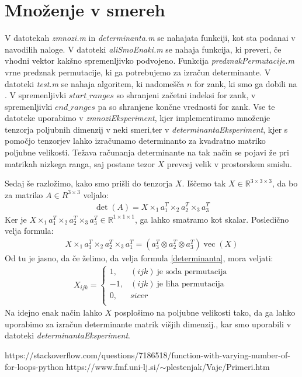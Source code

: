 \documentclass[a4paper,12pt]{article}
\def\R{\mathbb{R}} %
\DeclareMathOperator{\ve}{vec}
\begin{document}
\section{Množenje v smereh}
V datotekah \emph{zmnozi.m} in \emph{determinanta.m} se nahajata funkciji, kot sta podanai v navodilih naloge. V datoteki \emph{aliSmoEnaki.m} se nahaja funkcija, ki preveri, če vhodni vektor kakšno spremenljivko podvojeno. Funkcija \emph{predznakPermutacije.m} vrne predznak permutacije, ki ga potrebujemo za izračun determinante. V datoteki \emph{test.m} se nahaja algoritem, ki nadomešča $n$ for zank, ki smo ga dobili na \cite{vir1}. V spremenljivki $start\_ranges$ so shranjeni začetni indeksi for zank,  v spremenljivki $end\_ranges$ pa so shranjene končne vrednosti for zank. Vse te datoteke uporabimo v \emph{zmnoziEksperiment}, kjer implementiramo množenje tenzorja poljubnih dimenzij v neki smeri,ter v \emph{determinantaEksperiment}, kjer s pomočjo tenzorjev lahko izračunamo determinanto za kvadratno matriko poljubne velikosti. Težava računanja determinante na tak način se pojavi že pri matrikah nizkega ranga, saj postane tezor $X$ prevcej velik v prostorskem smislu. 

Sedaj še razložimo, kako smo prišli do tenzorja $X$. 
Iščemo tak $X\in \R^{3\times3\times3}$, da bo za matriko $A \in R^{3\times 3}$ veljalo:
\begin{align}
\label{determinanta}
	\det(A) = X \times_1 a_1^T \times_2 a_2^T \times_3 a_3^T
\end{align}
Ker je $X \times_1 a_1^T \times_2 a_2^T \times_3 a_3^T \in \R^{1\times1\times1}$, ga lahko smatramo kot skalar. Posledično velja formula: 
\begin{align*}
	X \times_1 a_1^T \times_2 a_2^T \times_3 a_1^T = (a_3^T\otimes a_2^T\otimes a_3^T)\ve(X)
\end{align*}
Od tu je jasno, da če želimo, da velja formula \eqref{determinanta}, mora veljati:
\begin{align*}
	X_{ijk} = \begin{cases}
	1 , &(i j k) ~\text{je soda permutacija}  \\
	-1, &(i j k) ~\text{je liha permutacija}  \\
	0, &sicer\\
	\end{cases}
\end{align*}
Na idejno enak način lahko $X$ posplošimo na poljubne velikosti tako, da ga lahko uporabimo za izračun determinante matrik višjih dimenzij., kar smo uporabili v datoteki \emph{determinantaEksperiment}.  

\begin{thebibliography}{1}
	https://stackoverflow.com/questions/7186518/function-with-varying-number-of-for-loops-python
	https://www.fmf.uni-lj.si/$\sim$plestenjak/Vaje/Primeri.htm
\end{thebibliography}
\end{document}
